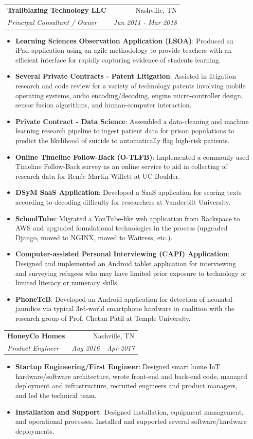 \documentclass[letterpaper,10pt]{article}
\makeatletter
\newcommand{\resumeItem}[2]{
  \item\small{
    \textbf{#1}{: #2 \vspace{-2pt}}
  }
}
\newcommand{\resumeSubheading}[4]{
  \vspace{-1pt}\item
    \begin{tabular*}{0.97\textwidth}[t]{l@{\extracolsep{\fill}}r}
      \textbf{#1} & #2 \\
      \textit{\small#3} & \textit{\small #4} \\
    \end{tabular*}\vspace{-5pt}
}
\newcommand{\resumeItemListStart}{\begin{itemize}}
\newcommand{\resumeItemListEnd}{\end{itemize}\vspace{-5pt}}
\makeatother
\begin{document}
    \resumeSubheading
      {Trailblazing Technology LLC}{Nashville, TN}
      {Principal Consultant / Owner}{Jun 2011 - Mar 2018}
      \resumeItemListStart
        \resumeItem{Learning Sciences Observation Application (LSOA)}
          {Produced an iPad application using an agile methodology to provide teachers with an efficient interface for rapidly capturing evidence of students learning.}
        \resumeItem{Several Private Contracts - Patent Litigation}
          {Assisted in litigation research and code review for a variety of technology patents involving mobile operating systems, audio encoding/decoding, engine micro-controller design, sensor fusion algorithms, and human-computer interaction.}
        \resumeItem{Private Contract - Data Science}
          {Assembled a data-cleaning and machine learning research pipeline to ingest patient data for prison populations to predict the likelihood of suicide to automatically flag high-risk patients.}
        \resumeItem{Online Timeline Follow-Back (O-TLFB)}
          {Implemented a commonly used Timeline Follow-Back survey as an online service to aid in collecting of research data for Renée Martin-Willett at UC Boulder.}
        \resumeItem{DSyM SaaS Application}
          {Developed a SaaS application for scoring texts according to decoding difficulty for researchers at Vanderbilt University.}
        \resumeItem{SchoolTube}
          {Migrated a YouTube-like web application from Rackspace to AWS and upgraded foundational technologies in the process (upgraded Django, moved to NGINX, moved to Waitress, etc.).}
        \resumeItem{Computer-assisted Personal Interviewing (CAPI) Application}
         {Designed and implemented an Android tablet application for interviewing and surveying refugees who may have limited prior exposure to technology or limited literacy or numeracy skills.}
        \resumeItem{PhoneTcB}
          {Developed an Android application for detection of neonatal jaundice via typical 3rd-world smartphone hardware in coalition with the research group of Prof. Chetan Patil at Temple University.}
      \resumeItemListEnd

    \resumeSubheading
      {HoneyCo Homes}{Nashville, TN}
      {Product Engineer}{Aug 2016 - Apr 2017}
      \resumeItemListStart
        \resumeItem{Startup Engineering/First Engineer}
          {Designed smart home IoT hardware/software architecture, wrote front-end and back-end code, managed deployment and infrastructure, recruited engineers and product managers, and led the technical team.}
        \resumeItem{Installation and Support}
          {Designed installation, equipment management, and operational processes. Installed and supported several software/hardware deployments.}
      \resumeItemListEnd
\end{document}
